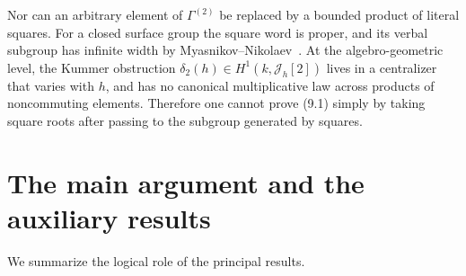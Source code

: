 \documentclass[11pt,reqno]{amsart}
\theoremstyle{definition}
\theoremstyle{remark}
\newcommand{\cJ}{\mathcal J}
\begin{document}
Nor can an arbitrary element of \(\Gamma^{(2)}\) be replaced by a bounded
product of literal squares.  For a closed surface group the square word is
proper, and its verbal subgroup has infinite width by
Myasnikov--Nikolaev~\cite{MyasnikovNikolaev}.  At the algebro-geometric level,
the Kummer obstruction
\(\delta_2(h)\in H^1(k,\cJ_h[2])\) lives in a centralizer that varies with \(h\),
and has no canonical multiplicative law across products of noncommuting
elements.  Therefore one cannot prove (9.1) simply by taking square roots
after passing to the subgroup generated by squares.

\section{The main argument and the auxiliary results}

We summarize the logical role of the principal results.
\end{document}
